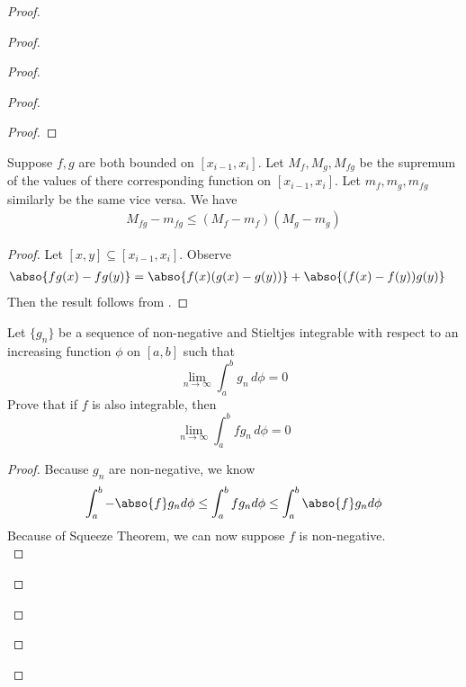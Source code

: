 \documentclass{report}
\begin{document}
\begin{proof}
\begin{proof}
\begin{proof}
\begin{proof}
\begin{proof}
\end{proof}
\begin{lemma}
\label{8.7.2}
Suppose $f,g$ are both bounded on  $[x_{i-1},x_i]$. Let $M_f,M_g,M_{fg}$ be the supremum of the values of there corresponding function on $[x_{i-1},x_i]$. Let $m_f,m_g,m_{fg}$ similarly be the same vice versa. We have 
\begin{align*}
M_{fg}-m_{fg}\leq (M_f-m_f)(M_g-m_g)
\end{align*}
\end{lemma}
\begin{proof}
Let $[x,y]\subseteq [x_{i-1},x_i]$. Observe 
\begin{align*}
\abso{fg(x)-fg(y)}&=\abso{f(x)(g(x)-g(y))}+\abso{(f(x)-f(y))g(y)}
\end{align*}
Then the result follows from . \end{proof}
\begin{question}{}{}

Let \( \{g_n\} \) be a sequence of non-negative and Stieltjes integrable with respect to an increasing function \( \phi \) on \( [a, b] \) such that
\[ \lim_{n \to \infty} \int_{a}^{b} g_n \, d\phi = 0 \]
Prove that if \( f \) is also integrable, then
\[ \lim_{n \to \infty} \int_{a}^{b} f g_n \, d\phi = 0 \]
\end{question}
\begin{proof}
Because $g_n$ are non-negative, we know 
 \begin{align*}
\int_a^b -\abso{f}g_nd\phi\leq \int_a^b fg_nd\phi \leq \int_a^b \abso{f}g_nd\phi
\end{align*}
Because of Squeeze Theorem, we can now suppose $f$ is non-negative.\\


\end{proof}
\end{proof}
\end{proof}
\end{proof}
\end{proof}
\end{document}
